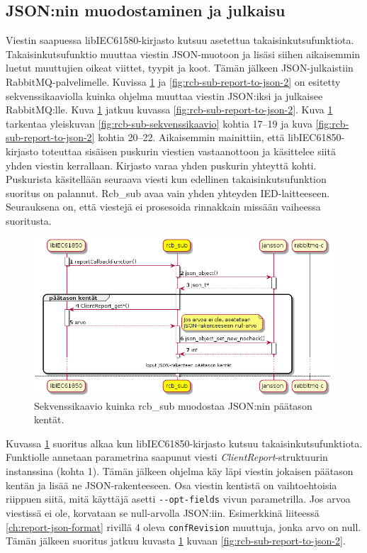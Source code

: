 \subsection{JSON:nin muodostaminen ja julkaisu}
Viestin saapuessa libIEC61580-kirjasto kutsuu asetettua takaisinkutsufunktiota. Takaisinkutsufunktio muuttaa viestin JSON-muotoon ja lisäsi siihen aikaisemmin luetut muuttujien oikeat viittet, tyypit ja koot. Tämän jälkeen JSON-julkaistiin RabbitMQ-palvelimelle. Kuvissa \ref{fig:rcb-sub-report-to-json-1} ja \ref{fig:rcb-sub-report-to-json-2} on esitetty sekvenssikaaviolla kuinka ohjelma muuttaa viestin JSON:iksi ja julkaisee RabbitMQ:lle. Kuva \ref{fig:rcb-sub-report-to-json-1} jatkuu kuvassa \ref{fig:rcb-sub-report-to-json-2}. Kuva \ref{fig:rcb-sub-report-to-json-1} tarkentaa yleiskuvan \ref{fig:rcb-sub-sekvenssikaavio} kohtia 17--19 ja kuva \ref{fig:rcb-sub-report-to-json-2} kohtia 20--22. Aikaisemmin mainittiin, että libIEC61850-kirjasto toteuttaa sisäisen puskurin viestien vastaanottoon ja käsittelee siitä yhden viestin kerrallaan. Kirjasto varaa yhden puskurin yhteyttä kohti. Puskurista käsitellään seuraava viesti kun edellinen takaisinkutsufunktion suoritus on palannut. Rcb\_sub avaa vain yhden yhteyden IED-laitteeseen. Seurauksena on, että viestejä ei prosesoida rinnakkain missään vaiheessa suoritusta.

\begin{figure}[ht!]
	\includegraphics[width=1\textwidth]{pictures/rcb-sub-report-to-json.png}
	\caption{Sekvenssikaavio kuinka rcb\_sub muodostaa JSON:nin päätason kentät.}
	\label{fig:rcb-sub-report-to-json-1}
\end{figure}

Kuvassa \ref{fig:rcb-sub-report-to-json-1} suoritus alkaa kun libIEC61850-kirjasto kutsuu takaisinkutsufunktiota. Funktiolle annetaan parametrina saapunut viesti \emph{ClientReport}-struktuurin instanssina (kohta 1). Tämän jälkeen ohjelma käy läpi viestin jokaisen päätason kentän ja lisää ne JSON-rakenteeseen. Osa viestin kentistä on vaihtoehtoisia riippuen siitä, mitä käyttäjä asetti \texttt{-{}-opt\--\-fields} vivun parametrilla. Jos arvoa viestissä ei ole, korvataan se null-arvolla JSON:iin. Esimerkkinä liiteessä \ref{ch:report-json-format} rivillä 4 oleva \texttt{confRevision} muuttuja, jonka arvo on null. Tämän jälkeen suoritus jatkuu kuvasta \ref{fig:rcb-sub-report-to-json-1} kuvaan \ref{fig:rcb-sub-report-to-json-2}.

